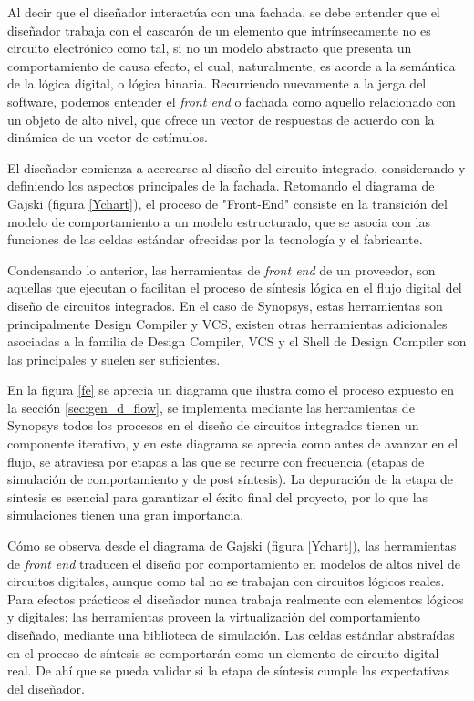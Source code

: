 Al decir que el diseñador interactúa con una fachada, se debe entender que el diseñador trabaja con el cascarón de un elemento que intrínsecamente no es circuito electrónico como tal, si no un modelo abstracto que presenta un comportamiento de causa efecto, el cual, naturalmente, es acorde a la semántica de la lógica digital, o lógica binaria. Recurriendo nuevamente a la jerga del software, podemos entender el \textit{front end} o fachada como aquello relacionado con un objeto de alto nivel, que ofrece un vector de respuestas de acuerdo con la dinámica de un vector de estímulos.

El diseñador comienza a acercarse al diseño del circuito integrado, considerando y definiendo los aspectos principales de la fachada. Retomando el diagrama de Gajski (figura \ref{Ychart}), el proceso de "Front-End" consiste en la transición del modelo de comportamiento a un modelo estructurado, que se asocia con las funciones de las celdas estándar ofrecidas por la tecnología y el fabricante.

Condensando lo anterior, las herramientas de \textit{front end} de un proveedor, son aquellas que ejecutan o facilitan el proceso de síntesis lógica en el flujo digital del diseño de circuitos integrados. En el caso de Synopsys, estas herramientas son principalmente Design Compiler y VCS, existen otras herramientas adicionales asociadas a la familia de Design Compiler, VCS y el Shell de Design Compiler son las principales y suelen ser suficientes.

En la figura \ref{fe} se aprecia un diagrama que ilustra como el proceso expuesto en la sección \ref{sec:gen_d_flow}, se implementa mediante las herramientas de Synopsys todos los procesos en el diseño de circuitos integrados tienen un componente iterativo, y en este diagrama se aprecia como antes de avanzar en el flujo, se atraviesa por etapas a las que se recurre con frecuencia (etapas de simulación de comportamiento y de post síntesis). La depuración de la etapa de síntesis es esencial para garantizar el éxito final del proyecto, por lo que las simulaciones tienen una gran importancia.

Cómo se observa desde el diagrama de Gajski (figura \ref{Ychart}), las herramientas de \textit{front end} traducen el diseño por comportamiento en modelos de altos nivel de circuitos digitales, aunque como tal no se trabajan con circuitos lógicos reales. Para efectos prácticos el diseñador nunca trabaja realmente con elementos lógicos y digitales: las herramientas proveen la virtualización del comportamiento diseñado, mediante una biblioteca de simulación. Las celdas estándar abstraídas en el proceso de síntesis se comportarán como un elemento de circuito digital real. De ahí que se pueda validar si la etapa de síntesis cumple las expectativas del diseñador.

